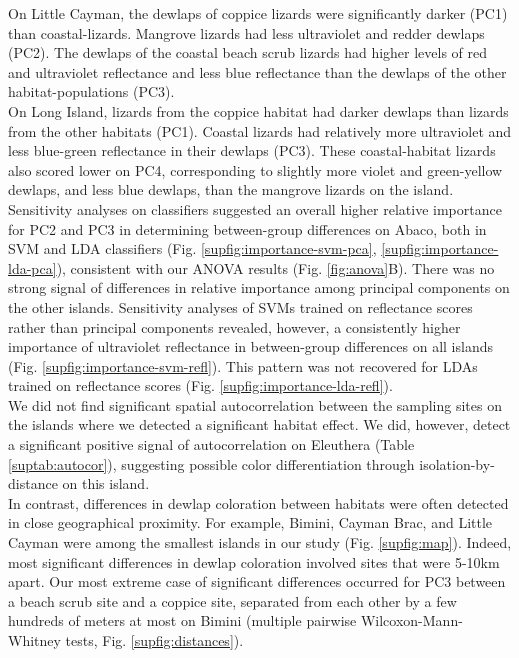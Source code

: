 On Little Cayman, the dewlaps of coppice lizards were significantly darker (PC1) than coastal-lizards. Mangrove lizards had less ultraviolet and redder dewlaps (PC2). The dewlaps of the coastal beach scrub lizards had higher levels of red and ultraviolet reflectance and less blue reflectance than the dewlaps of the other habitat-populations (PC3).\\

On Long Island, lizards from the coppice habitat had darker dewlaps than lizards from the other habitats (PC1). Coastal lizards had relatively more ultraviolet and less blue-green reflectance in their dewlaps (PC3). These coastal-habitat lizards also scored lower on PC4, corresponding to slightly more violet and green-yellow dewlaps, and less blue dewlaps, than the mangrove lizards on the island.\\

Sensitivity analyses on classifiers suggested an overall higher relative importance for PC2 and PC3 in determining between-group differences on Abaco, both in SVM and LDA classifiers (Fig. \ref{supfig:importance-svm-pca}, \ref{supfig:importance-lda-pca}), consistent with our ANOVA results (Fig. \ref{fig:anova}B). There was no strong signal of differences in relative importance among principal components on the other islands. Sensitivity analyses of SVMs trained on reflectance scores rather than principal components revealed, however, a consistently higher importance of ultraviolet reflectance in between-group differences on all islands (Fig. \ref{supfig:importance-svm-refl}). This pattern was not recovered for LDAs trained on reflectance scores (Fig. \ref{supfig:importance-lda-refl}).\\


We did not find significant spatial autocorrelation between the sampling sites on the islands where we detected a significant habitat effect. We did, however, detect a significant positive signal of autocorrelation on Eleuthera (Table \ref{suptab:autocor}), suggesting possible color differentiation through isolation-by-distance on this island.\\

In contrast, differences in dewlap coloration between habitats were often detected in close geographical proximity. For example, Bimini, Cayman Brac, and Little Cayman were among the smallest islands in our study (Fig. \ref{supfig:map}). Indeed, most significant differences in dewlap coloration involved sites that were 5-10km apart. Our most extreme case of significant differences occurred for PC3 between a beach scrub site and a coppice site, separated from each other by a few hundreds of meters at most on Bimini (multiple pairwise Wilcoxon-Mann-Whitney tests, Fig. \ref{supfig:distances}).\\

